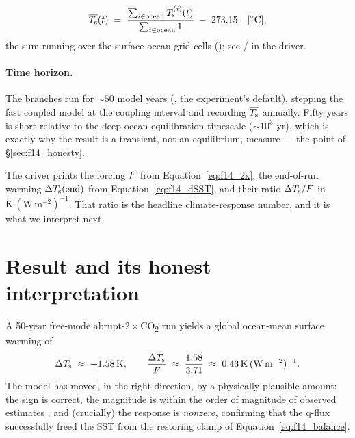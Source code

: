 \begin{equation}
  \overline{T_{\mathrm{s}}}(t) \;=\;
  \frac{\sum_{i\in\mathrm{ocean}} T_{\mathrm{s}}^{(i)}(t)}{\sum_{i\in\mathrm{ocean}} 1}
  \;-\; 273.15 \quad [^\circ\mathrm{C}],
  \label{eq:f14_oceanmean}
\end{equation}
the sum running over the surface ocean grid cells (); see
 /  in the driver.

\paragraph{Time horizon.} The branches run for $\sim\!50$ model years
(, the experiment's default), stepping the fast coupled model at
the coupling interval and recording $\overline{T_{\mathrm{s}}}$ annually. Fifty years is
short relative to the deep-ocean equilibration timescale ($\sim\!10^3$ yr), which
is exactly why the result is a transient, not an equilibrium, measure --- the
point of \S\ref{sec:f14_honesty}.

\begin{example}
The driver prints the forcing $F$ from Equation~\eqref{eq:f14_2x}, the
end-of-run warming $\Delta T_{\mathrm{s}}(\text{end})$ from Equation~\eqref{eq:f14_dSST},
and their ratio $\Delta T_{\mathrm{s}}/F$ in $\mathrm{K\,(W\,m^{-2})^{-1}}$. That ratio
is the headline climate-response number, and it is what we interpret next.
\end{example}

\section{Result and its honest interpretation}\label{sec:f14_result}

A 50-year free-mode abrupt-$2\times$CO\textsubscript{2} run yields a global
ocean-mean surface warming of
\begin{equation}
  \Delta T_{\mathrm{s}} \;\approx\; +1.58\,\mathrm{K},
  \qquad
  \frac{\Delta T_{\mathrm{s}}}{F} \;\approx\;
  \frac{1.58}{3.71} \;\approx\; 0.43\,\mathrm{K\,(W\,m^{-2})^{-1}}.
  \label{eq:f14_result}
\end{equation}
The model has moved, in the right direction, by a physically plausible amount:
the sign is correct, the magnitude is within the order of magnitude of observed
estimates \citep{ipcc2021ar6}, and (crucially) the response is \emph{nonzero}, confirming that the
q-flux successfully freed the SST from the restoring clamp of
Equation~\eqref{eq:f14_balance}.

